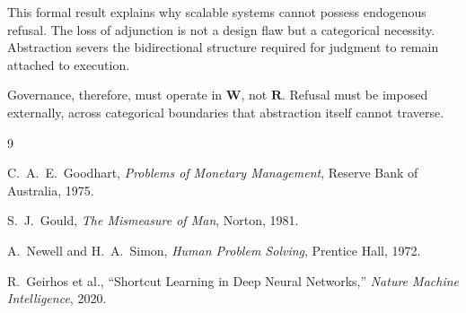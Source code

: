 \documentclass[12pt]{article}
\begin{document}
This formal result explains why scalable systems cannot possess endogenous refusal. The loss of adjunction is not a design flaw but a categorical necessity. Abstraction severs the bidirectional structure required for judgment to remain attached to execution.

Governance, therefore, must operate in $\mathbf{W}$, not $\mathbf{R}$. Refusal must be imposed externally, across categorical boundaries that abstraction itself cannot traverse.

\begin{thebibliography}{9}

C.~A.~E.~Goodhart, \emph{Problems of Monetary Management}, Reserve Bank of Australia, 1975.

S.~J.~Gould, \emph{The Mismeasure of Man}, Norton, 1981.

A.~Newell and H.~A.~Simon, \emph{Human Problem Solving}, Prentice Hall, 1972.

R.~Geirhos et al., ``Shortcut Learning in Deep Neural Networks,'' \emph{Nature Machine Intelligence}, 2020.

\end{thebibliography}
\end{document}
